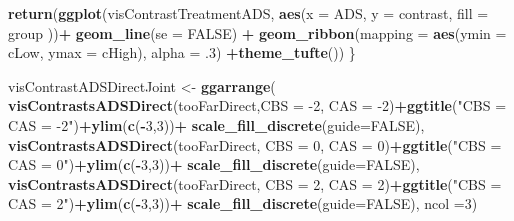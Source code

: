 \documentclass[10pt,dvipsnames,enabledeprecatedfontcommands]{scrartcl}
\newenvironment{Shaded}{\begin{snugshade}}{\end{snugshade}}
\newcommand{\KeywordTok}[1]{\textcolor[rgb]{0.13,0.29,0.53}{\textbf{#1}}}
\newcommand{\DataTypeTok}[1]{\textcolor[rgb]{0.13,0.29,0.53}{#1}}
\newcommand{\DecValTok}[1]{\textcolor[rgb]{0.00,0.00,0.81}{#1}}
\newcommand{\FloatTok}[1]{\textcolor[rgb]{0.00,0.00,0.81}{#1}}
\newcommand{\StringTok}[1]{\textcolor[rgb]{0.31,0.60,0.02}{#1}}
\newcommand{\OtherTok}[1]{\textcolor[rgb]{0.56,0.35,0.01}{#1}}
\newcommand{\OperatorTok}[1]{\textcolor[rgb]{0.81,0.36,0.00}{\textbf{#1}}}
\newcommand{\NormalTok}[1]{#1}
\begin{document}
\begin{Shaded}
\begin{Highlighting}[]
  \KeywordTok{return}\NormalTok{(}\KeywordTok{ggplot}\NormalTok{(visContrastTreatmentADS, }\KeywordTok{aes}\NormalTok{(}\DataTypeTok{x =}\NormalTok{ ADS, }\DataTypeTok{y =}\NormalTok{ contrast, }\DataTypeTok{fill =}\NormalTok{ group ))}\OperatorTok{+}
\StringTok{           }\KeywordTok{geom_line}\NormalTok{(}\DataTypeTok{se =} \OtherTok{FALSE}\NormalTok{) }\OperatorTok{+}
\StringTok{           }\KeywordTok{geom_ribbon}\NormalTok{(}\DataTypeTok{mapping =} \KeywordTok{aes}\NormalTok{(}\DataTypeTok{ymin =}\NormalTok{ cLow, }\DataTypeTok{ymax =}\NormalTok{ cHigh), }
                       \DataTypeTok{alpha =} \FloatTok{.3}\NormalTok{) }\OperatorTok{+}\KeywordTok{theme_tufte}\NormalTok{())}
\NormalTok{\}}





\NormalTok{visContrastADSDirectJoint <-}\StringTok{ }\KeywordTok{ggarrange}\NormalTok{(}
  \KeywordTok{visContrastsADSDirect}\NormalTok{(tooFarDirect,}\DataTypeTok{CBS =} \DecValTok{-2}\NormalTok{, }\DataTypeTok{CAS =} \DecValTok{-2}\NormalTok{)}\OperatorTok{+}\KeywordTok{ggtitle}\NormalTok{(}\StringTok{"CBS = CAS = -2"}\NormalTok{)}\OperatorTok{+}\KeywordTok{ylim}\NormalTok{(}\KeywordTok{c}\NormalTok{(}\OperatorTok{-}\DecValTok{3}\NormalTok{,}\DecValTok{3}\NormalTok{))}\OperatorTok{+}\StringTok{ }\KeywordTok{scale_fill_discrete}\NormalTok{(}\DataTypeTok{guide=}\OtherTok{FALSE}\NormalTok{),}
  \KeywordTok{visContrastsADSDirect}\NormalTok{(tooFarDirect, }\DataTypeTok{CBS =} \DecValTok{0}\NormalTok{, }\DataTypeTok{CAS =} \DecValTok{0}\NormalTok{)}\OperatorTok{+}\KeywordTok{ggtitle}\NormalTok{(}\StringTok{"CBS = CAS = 0"}\NormalTok{)}\OperatorTok{+}\KeywordTok{ylim}\NormalTok{(}\KeywordTok{c}\NormalTok{(}\OperatorTok{-}\DecValTok{3}\NormalTok{,}\DecValTok{3}\NormalTok{))}\OperatorTok{+}\StringTok{ }\KeywordTok{scale_fill_discrete}\NormalTok{(}\DataTypeTok{guide=}\OtherTok{FALSE}\NormalTok{),}
  \KeywordTok{visContrastsADSDirect}\NormalTok{(tooFarDirect, }\DataTypeTok{CBS =} \DecValTok{2}\NormalTok{, }\DataTypeTok{CAS =} \DecValTok{2}\NormalTok{)}\OperatorTok{+}\KeywordTok{ggtitle}\NormalTok{(}\StringTok{"CBS = CAS = 2"}\NormalTok{)}\OperatorTok{+}\KeywordTok{ylim}\NormalTok{(}\KeywordTok{c}\NormalTok{(}\OperatorTok{-}\DecValTok{3}\NormalTok{,}\DecValTok{3}\NormalTok{))}\OperatorTok{+}\StringTok{ }\KeywordTok{scale_fill_discrete}\NormalTok{(}\DataTypeTok{guide=}\OtherTok{FALSE}\NormalTok{),}
  \DataTypeTok{ncol =}\DecValTok{3}\NormalTok{)}
\end{Highlighting}
\end{Shaded}
\end{document}
